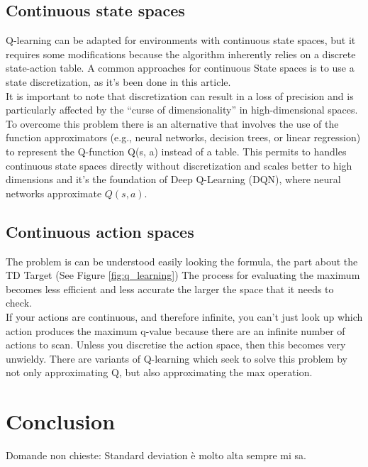 \documentclass{article}
\begin{document}
\subsection{Continuous state spaces}
Q-learning can be adapted for environments with continuous state spaces, but it requires some modifications because the algorithm inherently relies on a discrete state-action table. A common approaches for continuous State spaces
is to use a state discretization, as it's been done in this article. \\
It is important to note that discretization can result in a loss of precision and is particularly affected by the “curse of dimensionality”\cite{BELLMAN1958228} in high-dimensional spaces. \\
To overcome this problem there is an alternative that involves the use of the function approximators (e.g., neural networks, decision trees, or linear regression) to represent the Q-function Q(s, a) instead of a table. This permits to handles continuous state spaces directly without discretization and scales better to high dimensions and it's the foundation of Deep Q-Learning (DQN), where neural networks approximate $ Q(s, a) $.
 
\subsection{Continuous action spaces}
The problem is can be understood easily looking the formula, the part about the TD Target (See Figure \ref{fig:q_learning})
The process for evaluating the maximum becomes less efficient and less accurate the larger the space that it needs to check.\\
If your actions are continuous, and therefore infinite, you can’t just look up which action produces the maximum q-value because there are an infinite number of actions to scan.
Unless you discretise the action space, then this becomes very unwieldy.
There are variants of Q-learning which seek to solve this problem by not only approximating Q, but also approximating the max operation. 



\section{Conclusion}

Domande non chieste:
Standard deviation è molto alta sempre mi sa.

\label{sec:conclusion}


\end{document}
